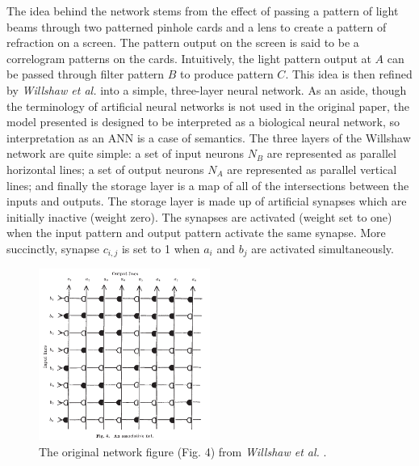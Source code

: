 \documentclass[a4paper,11pt,twoside,openright]{article}
\begin{document}
The idea behind the network stems from the effect of passing a pattern of light beams through two
patterned pinhole cards and a lens to create a pattern of refraction on a screen. The pattern output
on the screen is said to be a correlogram patterns on the cards. Intuitively, the light pattern output
at $A$ can be passed through filter pattern $B$ to produce pattern $C$. This idea is then refined by
\textit{Willshaw et al.} into a simple, three-layer neural network. As an aside, though the terminology of artificial
neural networks is not used in the original paper, the model presented is designed to be interpreted as
a biological neural network, so interpretation as an ANN is a case of semantics. The three layers of the
Willshaw network are quite simple: a set of input neurons $N_B$ are represented as parallel horizontal
lines; a set of output neurons $N_A$ are represented as parallel vertical lines; and finally the storage
layer is a map of all of the intersections between the inputs and outputs. The storage layer is made up of
artificial synapses which are initially inactive (weight zero). The synapses are activated (weight set to one)
when the input pattern and output pattern activate the same synapse. More succinctly, synapse $c_{i,j}$ is set
to 1 when $a_i$ and $b_j$ are activated simultaneously.

\begin{figure}[h]
 
  \centering
  \includegraphics[width=0.5\textwidth]{Willshaw1969Model}
  \caption{
    \label{fig:willshawnet} The original network figure (Fig. 4) from \textit{Willshaw et al.} \cite{Willshaw1969}.
  }
 
\end{figure}
\end{document}
